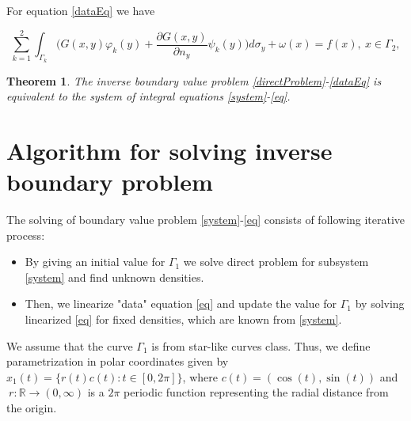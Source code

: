 \documentclass[12pt]{article}
\newtheorem{theorem}{Theorem}
\begin{document}
For equation \eqref{dataEq} we have

 \begin{equation}
	\label{eq}
	 \sum_{k=1}^{2}\int_{\Gamma_k}\bigg(G(x,y)\varphi_k(y)+\frac{\partial G(x,y)}{\partial n_y}\psi_k(y)\bigg)d\sigma_y+\omega(x)=f(x), \ x\in\Gamma_2, 
\end{equation}

\begin{theorem}
The inverse boundary value problem \eqref{directProblem}-\eqref{dataEq} is equivalent to the system of integral equations \eqref{system}-\eqref{eq}.
\end{theorem}
\section {Algorithm for solving inverse boundary problem}

The solving of boundary value problem \eqref{system}-\eqref{eq} consists of following iterative process:
\begin{itemize}
  \item  By giving an initial value for $\Gamma_1$ we solve direct problem for subsystem \eqref{system} and find unknown densities.
  \item Then, we linearize "data" equation \eqref{eq} and update the value for $\Gamma_1$ by solving linearized \eqref{eq} for fixed densities, which are known from \eqref{system}.
\end{itemize}
We assume that the curve $\Gamma_1$ is from star-like curves class. Thus, we define parametrization in polar coordinates given by 
$x_1(t)=\{r(t)c(t) : t\in[0,2\pi] \}$, where $c(t)=(\cos (t), \sin (t))$ and $\ r : \mathbb{R} \to (0, \infty)$ is a $2\pi$ periodic function representing
the radial distance from the origin.
\end{document}
